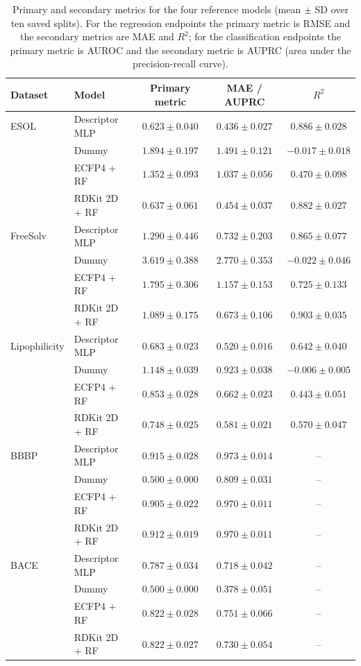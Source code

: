 \documentclass[10pt,a4paper]{article}
\renewcommand{\thetable}{S\arabic{table}}
\begin{document}
\begin{table}[H]
\renewcommand{\thetable}{S13}
\caption{Primary and secondary metrics for the four reference models (mean $\pm$ SD over ten saved splits). For the regression endpoints the primary metric is RMSE and the secondary metrics are MAE and $R^2$; for the classification endpoints the primary metric is AUROC and the secondary metric is AUPRC (area under the precision-recall curve).}\label{tab:secondary}
\centering\footnotesize
\begin{tabular}{@{}llccc@{}}
\toprule
Dataset & Model & Primary metric & MAE / AUPRC & $R^2$ \\
\midrule
ESOL & Descriptor MLP & $0.623\pm0.040$ & $0.436\pm0.027$ & $0.886\pm0.028$ \\
 & Dummy & $1.894\pm0.197$ & $1.491\pm0.121$ & $-0.017\pm0.018$ \\
 & ECFP4 + RF & $1.352\pm0.093$ & $1.037\pm0.056$ & $0.470\pm0.098$ \\
 & RDKit 2D + RF & $0.637\pm0.061$ & $0.454\pm0.037$ & $0.882\pm0.027$ \\
\midrule
FreeSolv & Descriptor MLP & $1.290\pm0.446$ & $0.732\pm0.203$ & $0.865\pm0.077$ \\
 & Dummy & $3.619\pm0.388$ & $2.770\pm0.353$ & $-0.022\pm0.046$ \\
 & ECFP4 + RF & $1.795\pm0.306$ & $1.157\pm0.153$ & $0.725\pm0.133$ \\
 & RDKit 2D + RF & $1.089\pm0.175$ & $0.673\pm0.106$ & $0.903\pm0.035$ \\
\midrule
Lipophilicity & Descriptor MLP & $0.683\pm0.023$ & $0.520\pm0.016$ & $0.642\pm0.040$ \\
 & Dummy & $1.148\pm0.039$ & $0.923\pm0.038$ & $-0.006\pm0.005$ \\
 & ECFP4 + RF & $0.853\pm0.028$ & $0.662\pm0.023$ & $0.443\pm0.051$ \\
 & RDKit 2D + RF & $0.748\pm0.025$ & $0.581\pm0.021$ & $0.570\pm0.047$ \\
\midrule
BBBP & Descriptor MLP & $0.915\pm0.028$ & $0.973\pm0.014$ & -- \\
 & Dummy & $0.500\pm0.000$ & $0.809\pm0.031$ & -- \\
 & ECFP4 + RF & $0.905\pm0.022$ & $0.970\pm0.011$ & -- \\
 & RDKit 2D + RF & $0.912\pm0.019$ & $0.970\pm0.011$ & -- \\
\midrule
BACE & Descriptor MLP & $0.787\pm0.034$ & $0.718\pm0.042$ & -- \\
 & Dummy & $0.500\pm0.000$ & $0.378\pm0.051$ & -- \\
 & ECFP4 + RF & $0.822\pm0.028$ & $0.751\pm0.066$ & -- \\
 & RDKit 2D + RF & $0.822\pm0.027$ & $0.730\pm0.054$ & -- \\
\bottomrule
\end{tabular}
\end{table}
\end{document}
